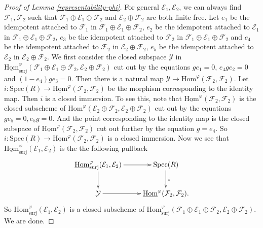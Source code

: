 \documentclass[10pt]{article}
\newtheorem{rmk}[thm]{Remark}
\numberwithin{equation}{section}
\newcommand{\calE}{{\mathcal E}}
\newcommand{\calF}{{\mathcal F}}
\newcommand{\calY}{{\mathcal Y}}
\newcommand{\Hom}{{\mathrm{Hom}}}           %
\newcommand{\Spec}{{\mathrm{Spec}}}         %
\newcommand{\surj}{\mathrm{surj}}
\begin{document}
\begin{proof}[Proof of Lemma \ref{representability-phi}]
For general $\calE_1,\calE_2$, we can always find $\calF_1,\calF_2$ such that $\calF_1\oplus \calE_1\oplus \calF_2$ and $\calE_2\oplus \calF_2$ are both finite free. Let $e_1$ be the idempotent attached to $\calF_1$ in $\calF_1\oplus \calE_1\oplus \calF_2$, $e_2$ be the idempotent attached to $\calE_1$ in $\calF_1\oplus \calE_1\oplus \calF_2$, $e_3$ be the idempotent attached to $\calF_2$ in $\calF_1\oplus \calE_1\oplus \calF_2$ and $e_4$ be the idempotent attached to $\calF_2$ in $\calE_2\oplus \calF_2$, $e_5$ be the idempotent attached to $\calE_2$ in $\calE_2\oplus \calF_2$. We first consider the closed subspace $\calY$ in $\underline\Hom_{\surj}^{\varphi}(\calF_1\oplus \calE_1\oplus \calF_2,\calE_2\oplus \calF_2)$ cut out by the equations $ge_1=0$, $e_4ge_2=0$ and $(1-e_4)ge_3=0$. Then there is a natural map $\calY\to \underline\Hom^{\varphi}(\calF_2,\calF_2)$. Let $i:\Spec(R)\to \underline\Hom^{\varphi}(\calF_2,\calF_2)$ be the morphism corresponding to the identity map. Then $i$ is a closed immersion. To see this, note that $\underline\Hom^{\varphi}(\calF_2,\calF_2)$ is the closed subscheme of $\underline\Hom^{\varphi}(\calE_2\oplus \calF_2,\calE_2\oplus\calF_2)$ cut out by the equations $ge_5=0, e_5g=0$. And the point corresponding to the identity map is the closed subspace of $\underline\Hom^{\varphi}(\calF_2,\calF_2)$ cut out further by the equation $g=e_4$. So $i:\Spec(R)\to \underline\Hom^{\varphi}(\calF_2,\calF_2)$ is a closed immersion. Now we see that $\underline\Hom_{\surj}^{\varphi}(\calE_1,\calE_2)$ is the the following pullback
\begin{equation}
    \xymatrix{
    \underline\Hom_{\surj}^{\varphi}(\calE_1,\calE_2)\ar[r]\ar[d]& \Spec(R)\ar[d]^{i}\\
    \calY\ar[r]& \underline\Hom^{\varphi}(\calF_2,\calF_2).\\
    }
\end{equation}
So $\underline\Hom_{\surj}^{\varphi}(\calE_1,\calE_2)$ is a closed subscheme of $\underline\Hom_{\surj}^{\varphi}(\calF_1\oplus \calE_1\oplus \calF_2,\calE_2\oplus \calF_2)$. We are done.
\end{proof}



\end{document}
